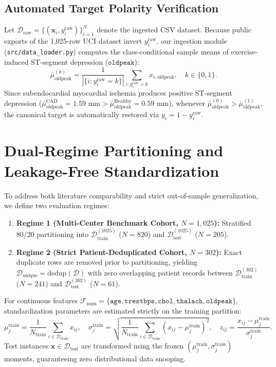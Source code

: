 \documentclass[12pt,a4paper]{report}
\begin{document}
\subsection{Automated Target Polarity Verification}
Let $\mathcal{D}_{\text{raw}} = \{(\bm{x}_i, y_i^{\text{raw}})\}_{i=1}^N$ denote the ingested CSV dataset. Because public exports of the 1,025-row UCI dataset invert $y_i^{\text{raw}}$, our ingestion module (\texttt{src/data\_loader.py}) computes the class-conditional sample means of exercise-induced ST-segment depression ($\texttt{oldpeak}$):
\begin{equation}
    \bar{\mu}_{\text{oldpeak}}^{(k)} = \frac{1}{|\{i : y_i^{\text{raw}} = k\}|} \sum_{i : y_i^{\text{raw}} = k} x_{i,\text{oldpeak}}, \quad k \in \{0, 1\}.
\end{equation}
Since subendocardial myocardial ischemia produces positive ST-segment depression ($\bar{\mu}_{\text{oldpeak}}^{\text{CAD}} = 1.59\text{ mm} > \bar{\mu}_{\text{oldpeak}}^{\text{Healthy}} = 0.59\text{ mm}$), whenever $\bar{\mu}_{\text{oldpeak}}^{(0)} > \bar{\mu}_{\text{oldpeak}}^{(1)}$, the canonical target is automatically restored via $y_i = 1 - y_i^{\text{raw}}$.

\section{Dual-Regime Partitioning and Leakage-Free Standardization}
To address both literature comparability and strict out-of-sample generalization, we define two evaluation regimes:
\begin{enumerate}
    \item \textbf{Regime 1 (Multi-Center Benchmark Cohort, $N = 1,025$):} Stratified 80/20 partitioning into $\mathcal{D}_{\text{train}}^{(1025)}$ ($N=820$) and $\mathcal{D}_{\text{test}}^{(1025)}$ ($N=205$).
    \item \textbf{Regime 2 (Strict Patient-Deduplicated Cohort, $N = 302$):} Exact duplicate rows are removed prior to partitioning, yielding $\mathcal{D}_{\text{unique}} = \text{dedup}(\mathcal{D})$ with zero overlapping patient records between $\mathcal{D}_{\text{train}}^{(302)}$ ($N=241$) and $\mathcal{D}_{\text{test}}^{(302)}$ ($N=61$).
\end{enumerate}

For continuous features $\mathcal{F}_{\text{num}} = \{\texttt{age}, \texttt{trestbps}, \texttt{chol}, \texttt{thalach}, \texttt{oldpeak}\}$, standardization parameters are estimated strictly on the training partition:
\begin{equation}
    \mu_j^{\text{train}} = \frac{1}{N_{\text{train}}} \sum_{i \in \mathcal{D}_{\text{train}}} x_{ij}, \quad
    \sigma_j^{\text{train}} = \sqrt{\frac{1}{N_{\text{train}}} \sum_{i \in \mathcal{D}_{\text{train}}} \left(x_{ij} - \mu_j^{\text{train}}\right)^2}, \quad
    z_{ij} = \frac{x_{ij} - \mu_j^{\text{train}}}{\sigma_j^{\text{train}}}.
\end{equation}
Test instances $\bm{x} \in \mathcal{D}_{\text{test}}$ are transformed using the frozen $(\mu_j^{\text{train}}, \sigma_j^{\text{train}})$ moments, guaranteeing zero distributional data snooping.
\end{document}
